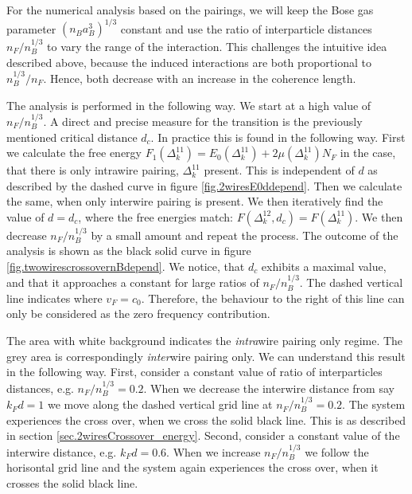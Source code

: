 For the numerical analysis based on the pairings, we will keep the Bose gas parameter $(n_Ba_B^3)^{1/3}$ constant and use the ratio of interparticle distances $n_F/n_B^{1/3}$ to vary the range of the interaction. This challenges the intuitive idea described above, because the induced interactions are both proportional to $n_B^{1/3}/n_F$. Hence, both decrease with an increase in the coherence length. 

The analysis is performed in the following way. We start at a high value of $n_F/n_B^{1/3}$. A direct and precise measure for the transition is the previously mentioned critical distance $d_c$. In practice this is found in the following way. First we calculate the free energy $F_1(\Delta^{11}_k) = E_0(\Delta^{11}_k) + 2 \mu (\Delta^{11}_k) N_F$ in the case, that there is only intrawire pairing, $\Delta^{11}_k$ present. This is independent of $d$ as described by the dashed curve in figure \ref{fig.2wiresE0ddepend}. Then we calculate the same, when only interwire pairing is present. We then iteratively find the value of $d = d_c$, where the free energies match: $F(\Delta^{12}_k, d_c) = F(\Delta^{11}_k)$. We then decrease $n_F/n_B^{1/3}$ by a small amount and repeat the process. The outcome of the analysis is shown as the black solid curve in figure \ref{fig.twowirescrossovernBdepend}. We notice, that $d_c$ exhibits a maximal value, and that it approaches a constant for large ratios of $n_F/n_B^{1/3}$. The dashed vertical line indicates where $v_F = c_0$. Therefore, the behaviour to the right of this line can only be considered as the zero frequency contribution. 

The area with white background indicates the \textit{intra}wire pairing only regime. The grey area is correspondingly \textit{inter}wire pairing only. We can understand this result in the following way. First, consider a constant value of ratio of interparticles distances, e.g. $n_F/n_B^{1/3} = 0.2$. When we decrease the interwire distance from say $k_Fd = 1$ we move along the dashed vertical grid line at $n_F/n_B^{1/3} = 0.2$. The system experiences the cross over, when we cross the solid black line. This is as described in section \ref{sec.2wiresCrossover_energy}. Second, consider a constant value of the interwire distance, e.g. $k_Fd = 0.6$. When we increase $n_F/n_B^{1/3}$ we follow the horisontal grid line and the system again experiences the cross over, when it crosses the solid black line. 

